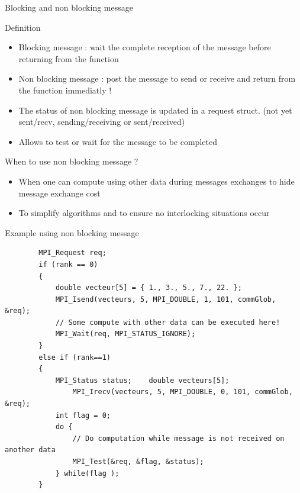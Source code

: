 \documentclass[compress,10pt,aspectratio=169]{beamer}
\begin{document}
\begin{frame}[fragile]{Blocking and non blocking message}
    \scriptsize
    \begin{block}{Definition}
        \begin{itemize}
            \item Blocking message : wait the complete reception of the message before returning from the function
            \item Non blocking message : post the message to send or receive and return from the function immediatly !
            \item The status of non blocking message is updated in a request struct. (not yet sent/recv, sending/receiving or sent/received)
            \item Allows to test or wait for the message to be completed
        \end{itemize}
    \end{block}

    \begin{exampleblock}{When to use non blocking message ?}
        \begin{itemize}
            \item When one can compute using other data during messages exchanges to hide message exchange cost
            \item To simplify algorithms and to ensure no interlocking situations occur
        \end{itemize}
    \end{exampleblock}

\end{frame}

\begin{frame}[fragile]{Example using non blocking message}
    
    \begin{verbatim}
        MPI_Request req;
        if (rank == 0) 
        {
            double vecteur[5] = { 1., 3., 5., 7., 22. };
            MPI_Isend(vecteurs, 5, MPI_DOUBLE, 1, 101, commGlob, &req);
            // Some compute with other data can be executed here!
            MPI_Wait(req, MPI_STATUS_IGNORE);
        }
        else if (rank==1) 
        {
            MPI_Status status;    double vecteurs[5];
                MPI_Irecv(vecteurs, 5, MPI_DOUBLE, 0, 101, commGlob, &req);
            int flag = 0;
            do {
                // Do computation while message is not received on another data
                MPI_Test(&req, &flag, &status);
            } while(flag );
        }
        \end{verbatim}
\end{frame}
\end{document}
